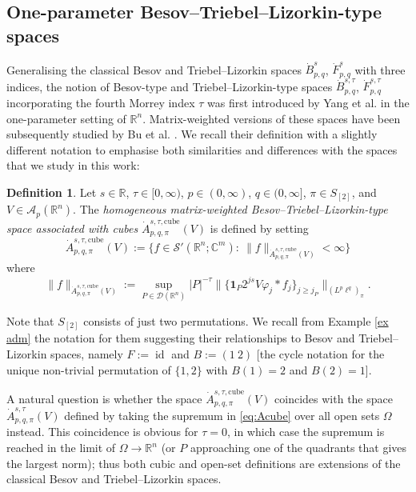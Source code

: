 \documentclass[11pt, reqno]{amsart}
\theoremstyle{definition}
\newtheorem{definition}[theorem]{Definition}
\theoremstyle{remark}
\numberwithin{equation}{section}
\newcommand{\R}{\mathbb R}
\newcommand{\one}{\mathbf{1}}
\begin{document}
\subsection{One-parameter Besov--Triebel--Lizorkin-type spaces} \label{BTL}

Generalising the classical Besov and Triebel--Lizorkin spaces $\dot B^s_{p,q}$, $\dot F^s_{p,q}$ with three indices, the notion of Besov-type and Triebel--Lizorkin-type spaces $\dot B^{s,\tau}_{p,q}$, $\dot F^{s,\tau}_{p,q}$ incorporating the fourth Morrey index $\tau$ was first introduced by Yang et al. \cite{YY08,YY10,YSY10} in the one-parameter setting of $\R^n$. Matrix-weighted versions of these spaces have been subsequently studied by Bu et al. \cite{BHYY:1a,BHYY:1b,BHYY:1c,BHYY:2a,BHYY:2b}. We recall their definition with a slightly different notation to emphasise both similarities and differences with the spaces that we study in this work:

\begin{definition}
Let $s\in\mathbb R$, $\tau\in[0,\infty)$,
$p\in(0,\infty)$, $q\in(0,\infty]$, $\pi\in S_{[2]}$,
and $V\in\mathscr A_p(\mathbb R^n)$.
The \emph{homogeneous matrix-weighted Besov--Triebel--Lizorkin-type space associated with cubes}
$\dot A^{s,\tau,\mathrm{cube}}_{p,q,\pi}(V)$
is defined by setting
$$
\dot A^{s,\tau,\mathrm{cube}}_{p,q,\pi}(V)
:=\big\{f\in \mathscr S'(\mathbb R^n;\mathbb C^m):\
\|f\|_{\dot A^{s,\tau,\mathrm{cube}}_{p,q,\pi}(V)}<\infty\big\}
$$
where
\begin{equation}\label{eq:Acube}
\|f\|_{\dot A^{s,\tau,\mathrm{cube}}_{p,q,\pi}(V)}
:=\sup_{P\in\mathscr D(\R^n)} |P|^{-\tau}
\Big\|\Big\{\one_P 2^{js}
V\varphi_j*f_j\Big\}_{j\geq j_P}\Big\|_{(L^p\ell^q)_{\pi}}.
\end{equation}
\end{definition}

Note that $S_{[2]}$ consists of just two permutations. We recall from Example \ref{ex adm} the notation for them suggesting their relationships to Besov and Triebel--Lizorkin spaces, namely $F:=\operatorname{id}$ and $B:=(1\ 2)$ [the cycle notation for the unique non-trivial permutation of $\{1,2\}$ with $B(1)=2$ and $B(2)=1$].

A natural question is whether
the space $\dot A^{s,\tau,\mathrm{cube}}_{p,q,\pi}(V)$
coincides with the space $\dot A^{s,\tau}_{p,q,\pi}(V)$ defined by taking the supremum in \eqref{eq:Acube} over all open sets $\Omega$ instead. This coincidence is obvious for $\tau=0$, in which case the supremum is reached in the limit of $\Omega\to\R^n$ (or $P$ approaching one of the quadrants that gives the largest norm); thus both cubic and open-set definitions are extensions of the classical Besov and Triebel--Lizorkin spaces.
\end{document}
